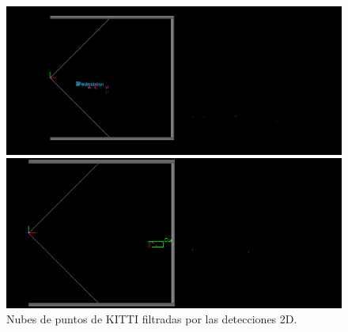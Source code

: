 \begin{figure}[H]
	\begin{minipage}{0.495\textwidth}
		\centering
		\includegraphics[width=1\linewidth]{Book/figures/7_roi/kitti_pcl_filt_0.png}
	\end{minipage}\hfill
	\begin{minipage}{0.495\textwidth}
		\centering
		\includegraphics[width=1\linewidth]{Book/figures/7_roi/kitti_pcl_filt_2.png}
	\end{minipage}
	\caption{Nubes de puntos de KITTI filtradas por las detecciones 2D.}
	\label{fig:Nubes de puntos de KITTI filtradas por las detecciones 2D.}
\end{figure}


